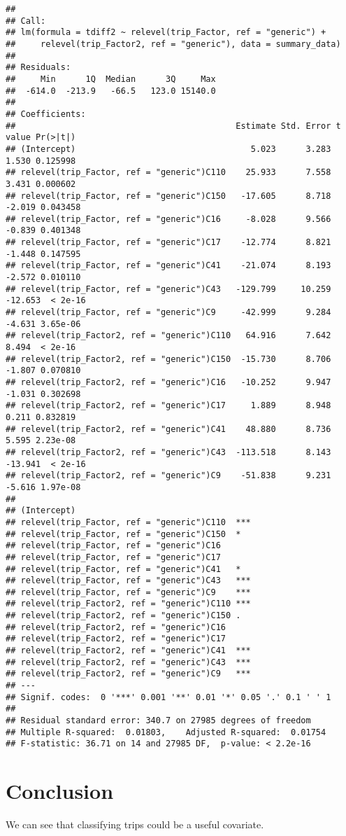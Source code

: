 \documentclass[]{article}
\begin{document}
\begin{verbatim}
## 
## Call:
## lm(formula = tdiff2 ~ relevel(trip_Factor, ref = "generic") + 
##     relevel(trip_Factor2, ref = "generic"), data = summary_data)
## 
## Residuals:
##     Min      1Q  Median      3Q     Max 
##  -614.0  -213.9   -66.5   123.0 15140.0 
## 
## Coefficients:
##                                            Estimate Std. Error t value Pr(>|t|)
## (Intercept)                                   5.023      3.283   1.530 0.125998
## relevel(trip_Factor, ref = "generic")C110    25.933      7.558   3.431 0.000602
## relevel(trip_Factor, ref = "generic")C150   -17.605      8.718  -2.019 0.043458
## relevel(trip_Factor, ref = "generic")C16     -8.028      9.566  -0.839 0.401348
## relevel(trip_Factor, ref = "generic")C17    -12.774      8.821  -1.448 0.147595
## relevel(trip_Factor, ref = "generic")C41    -21.074      8.193  -2.572 0.010110
## relevel(trip_Factor, ref = "generic")C43   -129.799     10.259 -12.653  < 2e-16
## relevel(trip_Factor, ref = "generic")C9     -42.999      9.284  -4.631 3.65e-06
## relevel(trip_Factor2, ref = "generic")C110   64.916      7.642   8.494  < 2e-16
## relevel(trip_Factor2, ref = "generic")C150  -15.730      8.706  -1.807 0.070810
## relevel(trip_Factor2, ref = "generic")C16   -10.252      9.947  -1.031 0.302698
## relevel(trip_Factor2, ref = "generic")C17     1.889      8.948   0.211 0.832819
## relevel(trip_Factor2, ref = "generic")C41    48.880      8.736   5.595 2.23e-08
## relevel(trip_Factor2, ref = "generic")C43  -113.518      8.143 -13.941  < 2e-16
## relevel(trip_Factor2, ref = "generic")C9    -51.838      9.231  -5.616 1.97e-08
##                                               
## (Intercept)                                   
## relevel(trip_Factor, ref = "generic")C110  ***
## relevel(trip_Factor, ref = "generic")C150  *  
## relevel(trip_Factor, ref = "generic")C16      
## relevel(trip_Factor, ref = "generic")C17      
## relevel(trip_Factor, ref = "generic")C41   *  
## relevel(trip_Factor, ref = "generic")C43   ***
## relevel(trip_Factor, ref = "generic")C9    ***
## relevel(trip_Factor2, ref = "generic")C110 ***
## relevel(trip_Factor2, ref = "generic")C150 .  
## relevel(trip_Factor2, ref = "generic")C16     
## relevel(trip_Factor2, ref = "generic")C17     
## relevel(trip_Factor2, ref = "generic")C41  ***
## relevel(trip_Factor2, ref = "generic")C43  ***
## relevel(trip_Factor2, ref = "generic")C9   ***
## ---
## Signif. codes:  0 '***' 0.001 '**' 0.01 '*' 0.05 '.' 0.1 ' ' 1
## 
## Residual standard error: 340.7 on 27985 degrees of freedom
## Multiple R-squared:  0.01803,    Adjusted R-squared:  0.01754 
## F-statistic: 36.71 on 14 and 27985 DF,  p-value: < 2.2e-16
\end{verbatim}

\hypertarget{conclusion}{%
\section{Conclusion}\label{conclusion}}

We can see that classifying trips could be a useful covariate.
\end{document}
